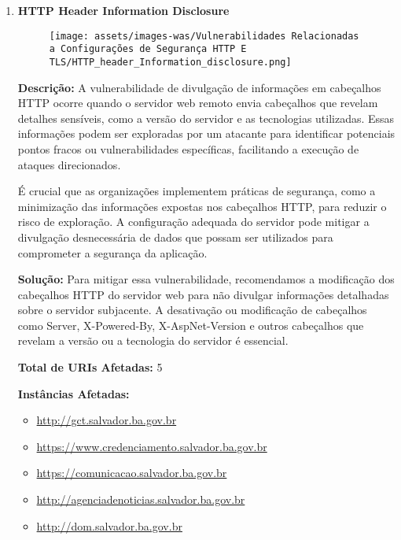 \documentclass[a4paper,12pt]{article}
\begin{document}
\begin{enumerate}
\item \textbf{HTTP Header Information Disclosure}

                        \begin{figure}[h!]
                        \centering
                        \texttt{[image: assets/images-was/Vulnerabilidades Relacionadas a Configurações de Segurança HTTP E TLS/HTTP\_header\_Information\_disclosure.png]}
                        \end{figure}
                        \FloatBarrier
                        \textbf{Descrição:} A vulnerabilidade de divulgação de informações em cabeçalhos HTTP ocorre quando o servidor web remoto envia cabeçalhos que revelam detalhes sensíveis, como a versão do servidor e as tecnologias utilizadas. Essas informações podem ser exploradas por um atacante para identificar potenciais pontos fracos ou vulnerabilidades específicas, facilitando a execução de ataques direcionados.

    É crucial que as organizações implementem práticas de segurança, como a minimização das informações expostas nos cabeçalhos HTTP, para reduzir o risco de exploração. A configuração adequada do servidor pode mitigar a divulgação desnecessária de dados que possam ser utilizados para comprometer a segurança da aplicação.

\textbf{Solução:} Para mitigar essa vulnerabilidade, recomendamos a modificação dos cabeçalhos HTTP do servidor web para não divulgar informações detalhadas sobre o servidor subjacente. A desativação ou modificação de cabeçalhos como Server, X-Powered-By, X-AspNet-Version e outros cabeçalhos que revelam a versão ou a tecnologia do servidor é essencial.

\textbf{Total de URIs Afetadas:} 5

\textbf{Instâncias Afetadas:}
\begin{itemize}
    \item \url{http://gct.salvador.ba.gov.br}
    \item \url{https://www.credenciamento.salvador.ba.gov.br}
    \item \url{https://comunicacao.salvador.ba.gov.br}
    \item \url{http://agenciadenoticias.salvador.ba.gov.br}
    \item \url{http://dom.salvador.ba.gov.br}
\end{itemize}


\end{enumerate}
\end{document}
